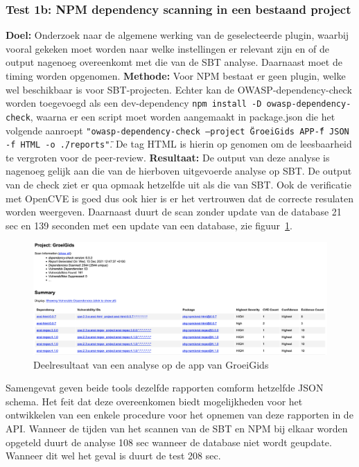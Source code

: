 \subsubsection{Test 1b: NPM dependency scanning in een bestaand project}

\textbf{Doel:} Onderzoek naar de algemene werking van de geselecteerde plugin, waarbij vooral gekeken moet worden naar welke instellingen er relevant zijn en of de output nagenoeg overeenkomt met die van de SBT analyse. Daarnaast moet de timing worden opgenomen.
\textbf{Methode:} Voor NPM bestaat er geen plugin, welke wel beschikbaar is voor SBT-projecten. Echter kan de OWASP-dependency-check worden toegevoegd als een dev-dependency \texttt{npm install -D owasp-dependency-check}, waarna er een script moet worden aangemaakt in package.json die het volgende aanroept \texttt{"owasp-dependency-check --project \"GroeiGids APP\" -f JSON -f HTML -o \"./reports\""}. De tag HTML is hierin op genomen om de leesbaarheid te vergroten voor de peer-review.
\textbf{Resultaat:} De output van deze analyse is nagenoeg gelijk aan die van de hierboven uitgevoerde analyse op SBT. De output van de check ziet er qua opmaak hetzelfde uit als die van SBT. Ook de verificatie met OpenCVE is goed dus ook hier is er het vertrouwen dat de correcte resulaten worden weergeven. Daarnaast duurt de scan zonder update van de database 21 sec en 139 seconden met een update van een database, zie figuur~\ref{fig:NPMReport1b}.

\begin{figure}[bth]
    \myfloatalign
    \includegraphics[width=15cm]{gfx/report_analyse_test1b_NPM}
    \caption{Deelresultaat van een analyse op de app van GroeiGids}
    \label{fig:NPMReport1b}
\end{figure}

Samengevat geven beide tools dezelfde rapporten comform hetzelfde JSON schema. Het feit dat deze overeenkomen biedt mogelijkheden voor het ontwikkelen van een enkele procedure voor het opnemen van deze rapporten in de API.
Wanneer de tijden van het scannen van de SBT en NPM bij elkaar worden opgeteld duurt de analyse 108 sec wanneer de database niet wordt geupdate. Wanneer dit wel het geval is duurt de test 208 sec.

